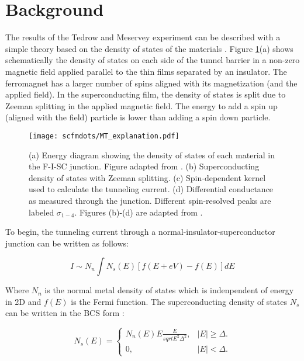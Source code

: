 \section{Background}

The results of the Tedrow and Meservey experiment can be described with a simple theory based on the density of states of the materials \cite{Meservey1994}. Figure \ref{fig:MT_explanation}(a) shows schematically the density of states on each side of the tunnel barrier in a non-zero magnetic field applied parallel to the thin films separated by an insulator. The ferromagnet has a larger number of spins aligned with its magnetization (and the applied field). In the superconducting film, the density of states is split due to Zeeman splitting in the applied magnetic field. The energy to add a spin up (aligned with the field) particle is lower than adding a spin down particle. 

\begin{figure}
    \centering
    \texttt{[image: scfmdots/MT\_explanation.pdf]}
    \caption{(a) Energy diagram showing the density of states of each material in the F-I-SC junction. Figure adapted from \cite{Moodera2010}. (b) Superconducting density of states with Zeeman splitting. (c) Spin-dependent kernel used to calculate the tunneling current. (d) Differential conductance as measured through the junction. Different spin-resolved peaks are labeled $\sigma_{1-4}$. Figures (b)-(d) are adapted from \cite{Meservey1994}.}
    \label{fig:MT_explanation}
\end{figure}

To begin, the tunneling current through a normal-insulator-superconductor junction can be written as follows:

\begin{equation}
    \label{eq:nis_junction}
    I \sim N_n \int N_s(E)[f(E+eV) - f(E)]dE
\end{equation}

Where $N_n$ is the normal metal density of states which is indenpendent of energy in 2D and $f(E)$ is the Fermi function. The superconducting density of states $N_s$ can be written in the BCS form \cite{Tinkham1996}:

\begin{equation}
    \label{eq:bcs_dos}
    N_s(E) = \begin{cases}
    N_n(E)E\frac{E}{sqrt{E^2 \Delta^2}}, & |E| \geq \Delta.\\
    0, & |E| < \Delta.
  \end{cases}
\end{equation}

